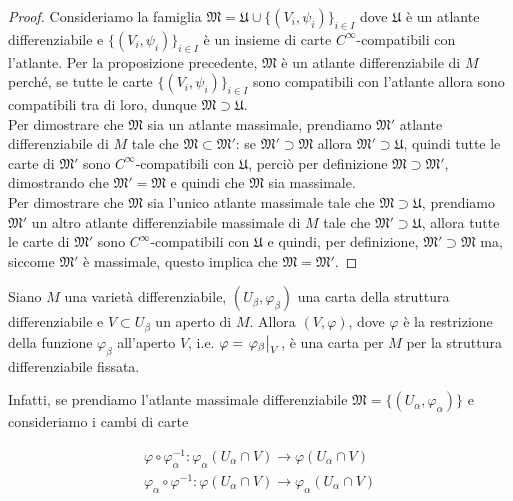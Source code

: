 \begin{proof}
	Consideriamo la famiglia $ \mathfrak{M} = \mathfrak{U} \cup \{(V_{i},\psi_{i})\}_{i \in I} $ dove $ \mathfrak{U} $ è un atlante differenziabile e $ \{(V_{i},\psi_{i})\}_{i \in I} $ è un insieme di carte $ C^{\infty} $-compatibili con l'atlante. Per la proposizione precedente, $ \mathfrak{M} $ è un atlante differenziabile di $ M $ perché, se tutte le carte $ \{(V_{i},\psi_{i})\}_{i \in I} $ sono compatibili con l'atlante allora sono compatibili tra di loro, dunque $ \mathfrak{M} \supset \mathfrak{U} $. \\
	Per dimostrare che $ \mathfrak{M} $ sia un atlante massimale, prendiamo $ \mathfrak{M}' $ atlante differenziabile di $ M $ tale che $ \mathfrak{M} \subset \mathfrak{M}' $: se $ \mathfrak{M}' \supset \mathfrak{M} $ allora $ \mathfrak{M}' \supset \mathfrak{U} $, quindi tutte le carte di $ \mathfrak{M}' $ sono $ C^{\infty} $-compatibili con $ \mathfrak{U} $, perciò per definizione $ \mathfrak{M} \supset \mathfrak{M}' $, dimostrando che $ \mathfrak{M}' = \mathfrak{M} $ e quindi che $ \mathfrak{M} $ sia massimale. \\
	Per dimostrare che $ \mathfrak{M} $ sia l'unico atlante massimale tale che $ \mathfrak{M} \supset \mathfrak{U} $, prendiamo $ \mathfrak{M}' $ un altro atlante differenziabile massimale di $ M $ tale che $ \mathfrak{M}' \supset \mathfrak{U} $, allora tutte le carte di $ \mathfrak{M}' $ sono $ C^{\infty} $-compatibili con $ \mathfrak{U} $ e quindi, per definizione, $ \mathfrak{M}' \supset \mathfrak{M} $ ma, siccome $ \mathfrak{M}' $ è massimale, questo implica che $ \mathfrak{M} = \mathfrak{M}' $.
\end{proof}

\begin{remark}
	Siano $ M $ una varietà differenziabile, $ (U_{\beta},\varphi_{\beta}) $ una carta della struttura differenziabile e $ V \subset U_{\beta} $ un aperto di $ M $. Allora $ (V,\varphi) $, dove $ \varphi $ è la restrizione della funzione $ \varphi_{\beta} $ all'aperto $ V $, i.e. $ \varphi = \eval{\varphi_{\beta}}_{V} $, è una carta per $ M $ per la struttura differenziabile fissata.
\end{remark}

Infatti, se prendiamo l'atlante massimale differenziabile $ \mathfrak{M} = \{(U_{\alpha},\varphi_{\alpha})\} $ e consideriamo i cambi di carte

\begin{gather}
	\varphi \circ \varphi_{\alpha}^{-1} : \varphi_{\alpha}(U_{\alpha} \cap V) \to \varphi(U_{\alpha} \cap V) \\
	\varphi_{\alpha} \circ \varphi^{-1} : \varphi(U_{\alpha} \cap V) \to \varphi_{\alpha}(U_{\alpha} \cap V)
\end{gather}

